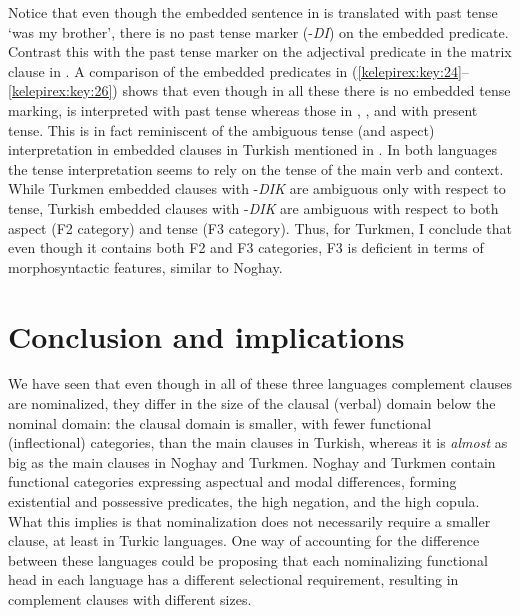 \documentclass[output=paper]{langsci/langscibook}
\begin{document}
Notice that even though the embedded sentence in  is translated with past tense `was my brother', there is no past tense marker (-\textit{DI}) on the embedded predicate. 
Contrast this with the past tense marker on the adjectival predicate in the matrix clause in . 
A comparison of the embedded predicates in (\ref{kelepirex:key:24}--\ref{kelepirex:key:26}) shows that even though in all these there is no embedded tense marking,  is interpreted with past tense whereas those in , , and  with present tense. 
This is in fact reminiscent of the ambiguous tense (and aspect) interpretation in embedded clauses in Turkish mentioned in . 
In both languages the tense interpretation seems to rely on the tense of the main verb and context. 
While Turkmen embedded clauses with -\textit{DIK} are ambiguous only with respect to tense, Turkish embedded clauses with -\textit{DIK} are ambiguous with respect to both aspect (F2 category) and tense (F3 category). 
Thus, for Turkmen, I conclude that even though it contains both F2 and F3 categories, F3 is deficient in terms of morphosyntactic features, similar to Noghay.

\section{Conclusion and implications} 
\label{kelepirsec:key:3}
\begin{sloppypar}
We have seen that even though in all of these three languages complement clauses are nominalized, they differ in the size of the clausal (verbal) domain below the nominal domain: 
the clausal domain is smaller, with fewer functional (inflectional) categories, than the main clauses in Turkish, whereas it is \textit{almost} as big as the main clauses in Noghay and Turkmen. 
Noghay and Turkmen contain functional categories expressing aspectual and modal differences, forming existential and possessive predicates, the high negation, and the high copula. 
What this implies is that nominalization does not necessarily require a smaller clause, at least in Turkic languages. 
One way of accounting for the difference between these languages could be proposing that each nominalizing functional head in each language has a different selectional requirement, resulting in complement clauses with different sizes.
\end{sloppypar}
\end{document}
